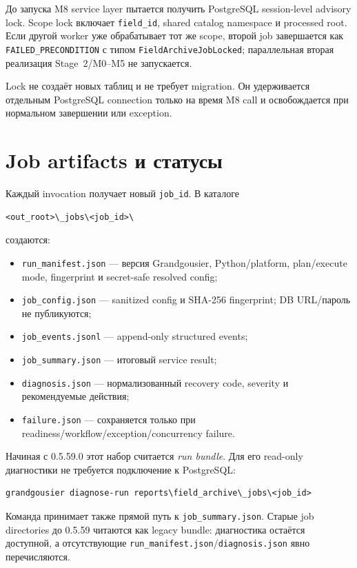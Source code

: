 До запуска M8 service layer пытается получить PostgreSQL session-level advisory lock. Scope lock включает \texttt{field\_id}, shared catalog namespace и processed root. Если другой worker уже обрабатывает тот же scope, второй job завершается как \texttt{FAILED\_PRECONDITION} с типом \texttt{FieldArchiveJobLocked}; параллельная вторая реализация Stage~2/M0--M5 не запускается.

Lock не создаёт новых таблиц и не требует migration. Он удерживается отдельным PostgreSQL connection только на время M8 call и освобождается при нормальном завершении или exception.

\section{Job artifacts и статусы}

Каждый invocation получает новый \texttt{job\_id}. В каталоге

\begin{lstlisting}
<out_root>\_jobs\<job_id>\
\end{lstlisting}

создаются:

\begin{itemize}
  \item \texttt{run\_manifest.json} --- версия Grandgousier, Python/platform, plan/execute mode, fingerprint и secret-safe resolved config;
  \item \texttt{job\_config.json} --- sanitized config и SHA-256 fingerprint; DB URL/пароль не публикуются;
  \item \texttt{job\_events.jsonl} --- append-only structured events;
  \item \texttt{job\_summary.json} --- итоговый service result;
  \item \texttt{diagnosis.json} --- нормализованный recovery code, severity и рекомендуемые действия;
  \item \texttt{failure.json} --- сохраняется только при readiness/workflow/exception/concurrency failure.
\end{itemize}

Начиная с 0.5.59.0 этот набор считается \emph{run bundle}. Для его read-only диагностики не требуется подключение к PostgreSQL:

\begin{lstlisting}
grandgousier diagnose-run reports\field_archive\_jobs\<job_id>
\end{lstlisting}

Команда принимает также прямой путь к \texttt{job\_summary.json}. Старые job directories до 0.5.59 читаются как legacy bundle: диагностика остаётся доступной, а отсутствующие \texttt{run\_manifest.json}/\texttt{diagnosis.json} явно перечисляются.

